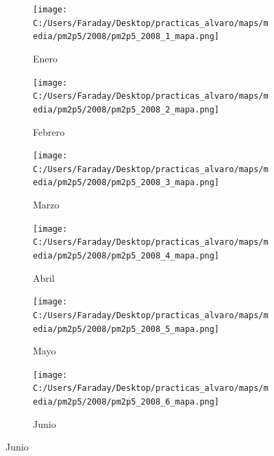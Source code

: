 \documentclass[12pt]{article}
\begin{document}
\begin{figure}[H]
\centering
\begin{subfigure}[H]{0.15\textwidth}
\texttt{[image: C:/Users/Faraday/Desktop/practicas\_alvaro/maps/media/pm2p5/2008/pm2p5\_2008\_1\_mapa.png]}
\captionsetup{labelformat=empty}
\caption{Enero}
\label{fig:map-pm2p5-2008-1}
\end{subfigure}
%
\begin{subfigure}[H]{0.15\textwidth}
\texttt{[image: C:/Users/Faraday/Desktop/practicas\_alvaro/maps/media/pm2p5/2008/pm2p5\_2008\_2\_mapa.png]}
\captionsetup{labelformat=empty}
\caption{Febrero}
\label{fig:map-pm2p5-2008-2}
\end{subfigure}
%
\begin{subfigure}[H]{0.15\textwidth}
\texttt{[image: C:/Users/Faraday/Desktop/practicas\_alvaro/maps/media/pm2p5/2008/pm2p5\_2008\_3\_mapa.png]}
\captionsetup{labelformat=empty}
\caption{Marzo}
\label{fig:map-pm2p5-2008-3}
\end{subfigure}
%
\begin{subfigure}[H]{0.15\textwidth}
\texttt{[image: C:/Users/Faraday/Desktop/practicas\_alvaro/maps/media/pm2p5/2008/pm2p5\_2008\_4\_mapa.png]}
\captionsetup{labelformat=empty}
\caption{Abril}
\label{fig:map-pm2p5-2008-4}
\end{subfigure}
%
\begin{subfigure}[H]{0.15\textwidth}
\texttt{[image: C:/Users/Faraday/Desktop/practicas\_alvaro/maps/media/pm2p5/2008/pm2p5\_2008\_5\_mapa.png]}
\captionsetup{labelformat=empty}
\caption{Mayo}
\label{fig:map-pm2p5-2008-5}
\end{subfigure}
%
\begin{subfigure}[H]{0.15\textwidth}
\texttt{[image: C:/Users/Faraday/Desktop/practicas\_alvaro/maps/media/pm2p5/2008/pm2p5\_2008\_6\_mapa.png]}
\captionsetup{labelformat=empty}
\caption{Junio}
\label{fig:map-pm2p5-2008-6}
\end{subfigure}


\end{figure}
\end{document}
